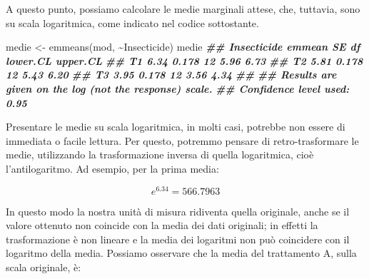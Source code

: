 \documentclass[
  12pt,
]{book}
\newenvironment{Shaded}{\begin{snugshade}}{\end{snugshade}}
\newcommand{\AttributeTok}[1]{\textcolor[rgb]{0.77,0.63,0.00}{#1}}
\newcommand{\DocumentationTok}[1]{\textcolor[rgb]{0.56,0.35,0.01}{\textbf{\textit{#1}}}}
\newcommand{\FunctionTok}[1]{\textcolor[rgb]{0.00,0.00,0.00}{#1}}
\newcommand{\NormalTok}[1]{#1}
\newcommand{\OtherTok}[1]{\textcolor[rgb]{0.56,0.35,0.01}{#1}}
\newcommand{\SpecialCharTok}[1]{\textcolor[rgb]{0.00,0.00,0.00}{#1}}
\newcommand{\StringTok}[1]{\textcolor[rgb]{0.31,0.60,0.02}{#1}}
\begin{document}
\begin{Shaded}
\end{Shaded}

A questo punto, possiamo calcolare le medie marginali attese, che, tuttavia, sono su scala logaritmica, come indicato nel codice sottostante.

\begin{Shaded}
\begin{Highlighting}[]
\NormalTok{medie }\OtherTok{\textless{}{-}} \FunctionTok{emmeans}\NormalTok{(mod, }\SpecialCharTok{\textasciitilde{}}\NormalTok{Insecticide)}
\NormalTok{medie}
\DocumentationTok{\#\#  Insecticide emmean    SE df lower.CL upper.CL}
\DocumentationTok{\#\#  T1            6.34 0.178 12     5.96     6.73}
\DocumentationTok{\#\#  T2            5.81 0.178 12     5.43     6.20}
\DocumentationTok{\#\#  T3            3.95 0.178 12     3.56     4.34}
\DocumentationTok{\#\# }
\DocumentationTok{\#\# Results are given on the log (not the response) scale. }
\DocumentationTok{\#\# Confidence level used: 0.95}
\end{Highlighting}
\end{Shaded}

Presentare le medie su scala logaritmica, in molti casi, potrebbe non essere di immediata o facile lettura. Per questo, potremmo pensare di retro-trasformare le medie, utilizzando la trasformazione inversa di quella logaritmica, cioè l'antilogaritmo. Ad esempio, per la prima media:

\[e^{6.34} = 566.7963\]

In questo modo la nostra unità di misura ridiventa quella originale, anche se il valore ottenuto non coincide con la media dei dati originali; in effetti la trasformazione è non lineare e la media dei logaritmi non può coincidere con il logaritmo della media. Possiamo osservare che la media del trattamento A, sulla scala originale, è:
\end{document}
